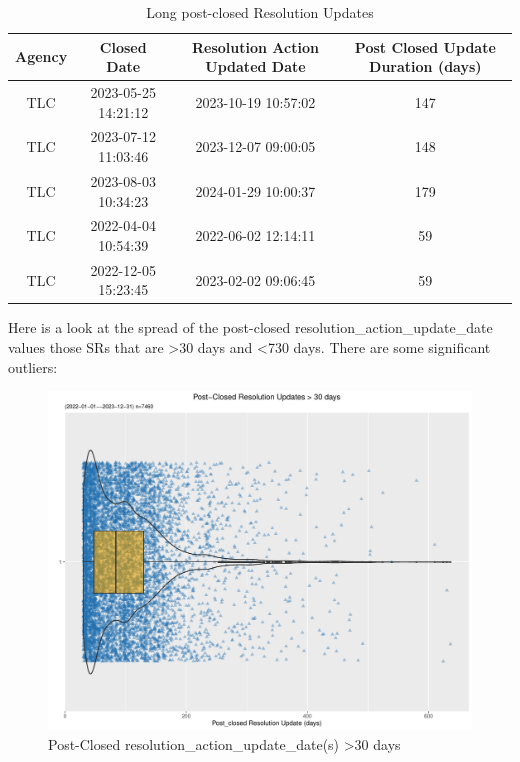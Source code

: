 \documentclass[12pt, titlepage]{article}
\begin{document}
	\begin{table}[tbp]
    	\centering
     \caption{Long post-closed Resolution Updates}
	    	\begin{tabular}{cccc}
		        \hline
		        Agency & Closed Date & Resolution Action Updated Date 
		        & Post Closed Update Duration (days) \\
		        \hline
		        TLC & 2023-05-25 14:21:12 & 2023-10-19 10:57:02 & 147 \\
		        TLC & 2023-07-12 11:03:46 & 2023-12-07 09:00:05 & 148 \\
		        TLC & 2023-08-03 10:34:23 & 2024-01-29 10:00:37 & 179 \\
		        TLC & 2022-04-04 10:54:39 & 2022-06-02 12:14:11 & 59 \\
		        TLC & 2022-12-05 15:23:45 & 2023-02-02 09:06:45 & 59 \\
		        \hline
		\end{tabular}
    	\label{tab:resolution}
	\end{table}

	Here is a look at the spread of the post-closed resolution\_action\_update\_date 
	values those SRs 	that are \textgreater30 days and \textless{}730 days. 
	There are some significant outliers: 
	
	\begin{figure}[tbp]
		\centering
		\includegraphics[width = \textwidth]{post_closed_violin.pdf}
		\caption{Post-Closed resolution\_action\_update\_date(s) 
		\textgreater30 days}
		\label{fig:resolution-violin}
	\end{figure}		
\end{document}

